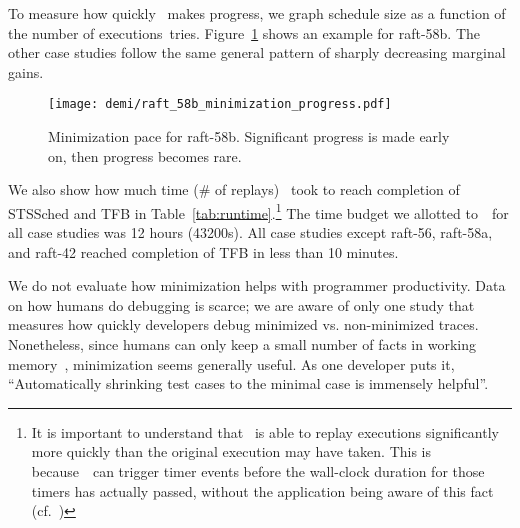 
 To measure how quickly \sys~makes
progress, we graph schedule size as a function of the number of
executions~\sys tries.
Figure~\ref{fig:progress} shows an example for
raft-58b. The other case studies follow the same general pattern of sharply decreasing
marginal gains.

\begin{figure}[tb]
    \centering
    \texttt{[image: demi/raft\_58b\_minimization\_progress.pdf]}
    \caption{\label{fig:progress} Minimization pace for raft-58b. Significant progress is made early on, then progress becomes rare.}
\end{figure}


We also show how much time (\# of replays) \sys~took to reach completion of
STSSched and TFB in Table~\ref{tab:runtime}.\footnote{It is important
to understand that \sys~is able to replay executions significantly more quickly
than the original execution may have taken. This is because~\sys~can trigger timer events before the wall-clock duration for
those timers has actually passed, without the application being aware of this
fact (cf.~\cite{Gupta06toinfinity})} The time budget we allotted to~\sys~for all case studies was 12 hours (43200s).
All case studies except raft-56, raft-58a, and raft-42 reached completion of TFB in less than 10
minutes.

 We do not evaluate how minimization helps
with programmer productivity. Data on how humans do debugging is scarce; we
are aware of only one study that measures how
quickly developers debug minimized vs. non-minimized traces\cite{fse_web_ddmin}.
Nonetheless, since humans can only keep a small number of facts in working
memory~\cite{miller56seven}, minimization seems generally useful. As one
developer
puts it,
``Automatically shrinking test cases to the
minimal case is immensely helpful''\cite{riak_quote}.

